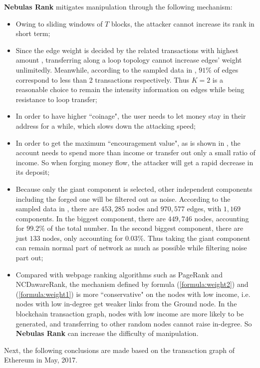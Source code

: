\textbf{Nebulas Rank} mitigates manipulation through the following mechanism:
\begin{itemize}
	\item Owing to sliding windows of $T$ blocks, the attacker cannot increase its rank in short term;
	\item Since the edge weight is decided by the related transactions with highest amount , transferring along a loop topology cannot increase edges' weight unlimitedly. Meanwhile, according to the sampled data in , $91\%$ of edges correspond to less than 2 transactions respectively. Thus $K=2$ is a reasonable choice to remain the intensity information on edges while being resistance to loop transfer;
	\item In order to have higher ``coinage", the user needs to let money stay in their address for a while, which slows down the attacking speed;
	\item In order to get the maximum ``encouragement value", as is shown in , the account needs to spend more than income or transfer out only a small ratio of income. So when forging money flow, the attacker will get a rapid decrease in its deposit;
	\item Because only the giant component is selected, other independent components including the forged one will be filtered out as noise. According to the sampled data in , there are $453,285$ nodes and $970,577$ edges, with $1,169$ components. In the biggest component, there are $449,746$ nodes, accounting for $99.2\%$ of the total number. In the second biggest component, there are just $133$ nodes, only accounting for $0.03\%$. Thus taking the giant component can remain normal part of network as much as possible while filtering noise part out;
	\item Compared with webpage ranking algorithms such as PageRank and NCDawareRank\cite{Nikolakopoulos2013}, the mechanism defined by formula (\ref{formula:weight2}) and (\ref{formula:weight1}) is more ``conservative" on the nodes with low income, i.e. nodes with low in-degree get weaker links from the Ground node. In the blockchain transaction graph, nodes with low income are more likely to be generated, and transferring to other random nodes cannot raise in-degree. So \textbf{Nebulas Rank} can increase the difficulty of manipulation.
\end{itemize}

Next, the following conclusions are made based on the transaction graph of Ethereum in May, 2017.


